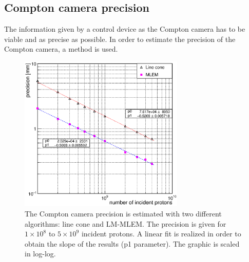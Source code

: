 
\subsection{Compton camera precision}


The information given by a control device as the Compton camera has to be viable and as precise as possible. In order to estimate the precision of the Compton camera, a method is used. 

\begin{figure}[!hbtp]	
\centering
\caption{The Compton camera precision is estimated with two different algorithms: line cone and LM-MLEM. The precision is given for $1\times10^{8}$ to $5\times10^{9}$ incident protons. A linear fit is realized in order to obtain the slope of the results (p1 parameter). The graphic is scaled in log-log. }	
\includegraphics[width=0.7\textwidth]{./Figure/2017-10-21_Precision_Comparaison_linecone_MLEM_Article_Fit.eps}
\end{figure}



